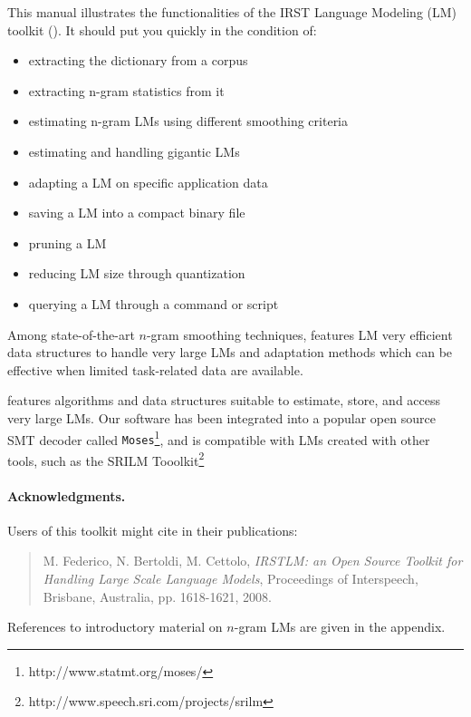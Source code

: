 This manual illustrates the functionalities of  the IRST Language  Modeling (LM)  toolkit ({\IRSTLM}). It  should  
put you quickly  in  the condition of:
\begin{itemize}
\item extracting the dictionary from a corpus
\item extracting n-gram statistics from it
\item estimating n-gram LMs using different smoothing criteria
\item estimating and handling gigantic LMs
\item adapting a LM on specific application data
\item saving a  LM into a compact binary file
\item pruning a LM
\item reducing LM size through quantization
\item querying a LM through a command or script
\end{itemize}

\noindent
Among  state-of-the-art  $n$-gram  smoothing  techniques, {\IRSTLM} features LM  very efficient 
data structures to handle very large LMs and adaptation  methods which  can  be effective when limited task-related  data are available. 

{\IRSTLM} features algorithms and data structures suitable to estimate, 
store, and access very  large LMs.  Our software has been integrated into a popular open source 
SMT decoder  called {\tt Moses}\footnote{http://www.statmt.org/moses/}, and is compatible with LMs
created with other tools, such as the SRILM Tooolkit\footnote{http://www.speech.sri.com/projects/srilm}


\paragraph{Acknowledgments.}Users of this toolkit  might cite in their publications:
\begin{quote}
M. Federico,  N. Bertoldi,  M. Cettolo, {\em IRSTLM: an Open Source Toolkit for Handling Large Scale Language Models}, Proceedings of Interspeech, Brisbane, Australia, pp. 1618-1621, 2008.
\end{quote}

\noindent
References to introductory material on $n$-gram LMs are given in the appendix. 


